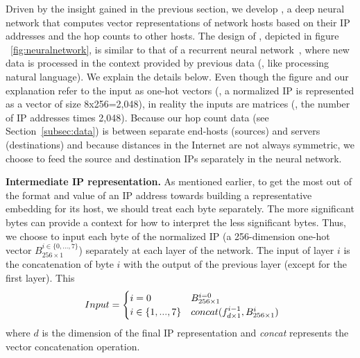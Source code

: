 Driven by the insight gained in the previous section, we develop \system{}, a deep neural network that computes vector representations of network hosts based on their IP addresses and the hop counts to other hosts. 
%
The design of \system{}, depicted in figure ~\ref{fig:neuralnetwork}, is similar to that of a recurrent neural network~\citep{mikolov2010recurrent}, where new data is processed in  the context provided by previous data (\eg{}, like processing natural language).
%
We explain the details below. Even though the figure and our explanation refer to the input as one-hot vectors (\eg{}, a normalized IP is represented as a vector of size 8x256=2,048), in reality the inputs are matrices (\ie{}, the number of IP addresses times 2,048). Because our hop count data (see Section~\ref{subsec:data}) is between separate end-hosts (sources) and servers (destinations) and because distances in the Internet are not always symmetric, we choose to feed the source and destination IPs separately in the neural network. %

\textbf{Intermediate IP representation.} As mentioned earlier, to get the most out of the format and value of an IP address towards building a representative embedding for its host, we should treat each byte separately. The more significant bytes can provide a context for how to interpret the less significant bytes. Thus, we choose to input each byte of the normalized IP (a 256-dimension one-hot vector $B^{i\in \{0,...,7\}}_{256\times1}$) separately at each layer of the network. The input of layer $i$ is the concatenation of byte $i$ with the output of the previous layer (except for the first layer). This %
\begin{align} 
\label{equ:input} 
Input=
\begin{cases}
i = 0&\parbox{.25\textwidth}{$ B^{i=0}_{256\times1}$} \\
i\in\{1,...,7\}&\parbox{.25\textwidth}{$ concat(f^{i-1}_{d\times 1},  B^{i}_{256\times1})$ } 
\end{cases}
\end{align}
where $d$ is the dimension of the final IP representation and \emph{concat} represents the vector concatenation operation.

